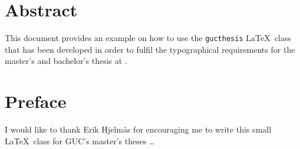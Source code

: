 \thesistitlepage %

\chapter*{Abstract}

This document provides an example on how to use the
\texttt{gucthesis} \LaTeX\ class that has been developed in
order to fulfil the typographical requirements for the master's and bachelor's thesis
at \GUC.

%

\chapter*{Preface}

I would like to thank Erik Hjelm\aa{}s for encouraging me to write this
small \LaTeX\ class for GUC's master's theses \dots

